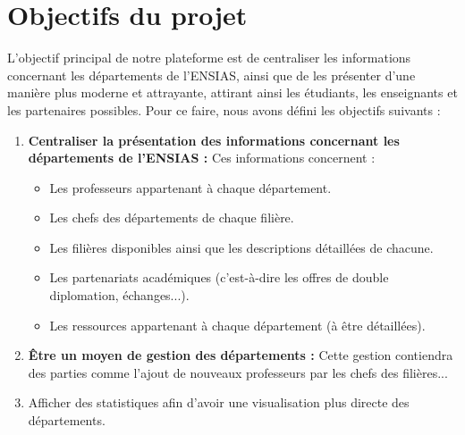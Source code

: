 \section{Objectifs du projet}
L'objectif principal de notre plateforme est de centraliser les informations concernant les départements de l'ENSIAS, ainsi que de les présenter d'une manière plus moderne et attrayante, attirant ainsi les étudiants, les enseignants et les partenaires possibles. Pour ce faire, nous avons défini les objectifs suivants :
\begin{enumerate}
    \item \textbf{Centraliser la présentation des informations concernant les départements de l'ENSIAS :} Ces informations concernent :
    \begin{itemize}
        \item Les professeurs appartenant à chaque département.
        \item Les chefs des départements de chaque filière.
        \item Les filières disponibles ainsi que les descriptions détaillées de chacune.
        \item Les partenariats académiques (c'est-à-dire les offres de double diplomation, échanges...).
        \item Les ressources appartenant à chaque département (à être détaillées).
    \end{itemize}
    \item \textbf{Être un moyen de gestion des départements :} Cette gestion contiendra des parties comme l'ajout de nouveaux professeurs par les chefs des filières...
    \item Afficher des statistiques afin d'avoir une visualisation plus directe des départements.
\end{enumerate}

